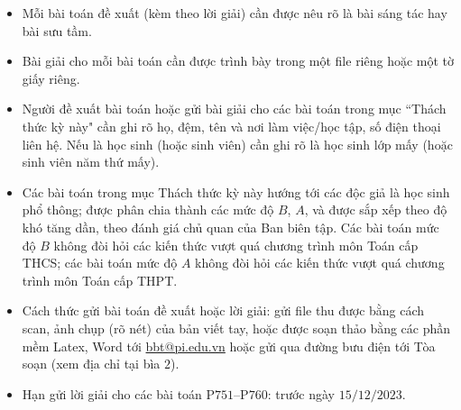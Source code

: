 \thispagestyle{thachthuctoanhocnone}
\pagestyle{thachthuctoanhoc}
\everymath{\color{thachthuctoanhoc}}
\graphicspath{{../thachthuctoanhoc/pic/}}
\begingroup
{}
\centering
\vspace*{4cm}
\endgroup
\vspace*{-8pt}
\begin{tBox}
	\begin{itemize}[leftmargin = 13pt, itemsep = 1.0pt] 
		\item Mỗi bài toán đề xuất (kèm theo lời giải) cần được nêu rõ là bài sáng tác hay bài sưu tầm.
		\item Bài giải cho mỗi bài toán cần được trình bày trong một file riêng hoặc
		một tờ giấy riêng.
		\item  Người đề xuất bài toán hoặc gửi bài giải cho các bài toán trong mục ``Thách thức kỳ này" cần ghi rõ họ, đệm, tên và nơi làm việc/học tập, số điện thoại liên hệ. Nếu là học sinh (hoặc sinh viên) cần ghi rõ là học sinh lớp mấy (hoặc sinh viên năm thứ mấy).
		\item Các bài toán trong mục Thách thức kỳ này hướng tới các độc giả là học sinh phổ thông; được phân chia thành các mức độ $B$, $A$, và được sắp xếp theo độ khó tăng dần, theo đánh giá chủ quan của Ban biên tập. Các bài toán mức độ $B$ không đòi hỏi các kiến thức vượt quá chương trình môn Toán cấp THCS; các bài toán mức độ $A$ không đòi hỏi các kiến thức vượt quá chương trình môn Toán cấp THPT.
		\item Cách thức gửi bài toán đề xuất hoặc lời giải: gửi file thu được bằng cách scan, ảnh chụp (rõ nét) của bản viết tay, hoặc được soạn thảo bằng các phần mềm Latex, Word tới \url{bbt@pi.edu.vn} hoặc gửi qua đường bưu điện tới Tòa soạn (xem địa chỉ tại bìa $2$).
		\item Hạn gửi lời giải cho các bài toán P$751$--P$760$: trước ngày $15/12/2023$.
	\end{itemize}
\end{tBox}
